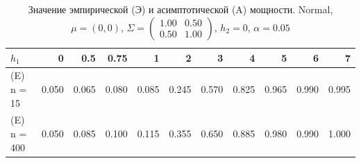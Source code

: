 \begin{table}[ht]
\centering
\caption{Значение эмпирической (Э) и асимптотической (A) мощности. Normal, $\mu = (0, 0)$, $\Sigma = \begin{pmatrix}
1.00 & 0.50 \\
0.50 & 1.00
\end{pmatrix}$, $h_2 = 0$, $\alpha = 0.05$} 
\label{tab:power_table}
\begin{tabular}{lrrrrrrrrrr}
  \hline
$h_{1}$ & 0 & 0.5 & 0.75 & 1 & 2 & 3 & 4 & 5 & 6 & 7 \\ 
  \hline
(E) n = 15 & 0.050 & 0.065 & 0.080 & 0.085 & 0.245 & 0.570 & 0.825 & 0.965 & 0.990 & 0.995 \\ 
  (E) n = 400 & 0.050 & 0.085 & 0.100 & 0.115 & 0.355 & 0.650 & 0.885 & 0.980 & 0.990 & 1.000 \\ 
   \hline
\end{tabular}
\end{table}

